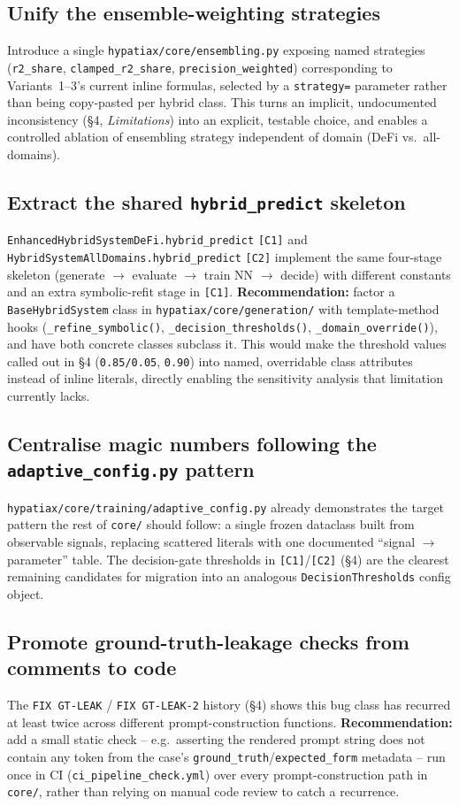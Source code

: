 \documentclass[11pt,a4paper]{article}
\newcommand{\code}[1]{\texttt{\small #1}}
\begin{document}
\subsection{Unify the ensemble-weighting strategies}
Introduce a single \code{hypatiax/core/ensembling.py} exposing named
strategies (\code{r2\_share}, \code{clamped\_r2\_share},
\code{precision\_weighted}) corresponding to Variants~1--3's current
inline formulas, selected by a \code{strategy=} parameter rather than
being copy-pasted per hybrid class. This turns an implicit, undocumented
inconsistency (\S4, \emph{Limitations}) into an explicit, testable choice,
and enables a controlled ablation of ensembling strategy independent of
domain (DeFi vs.\ all-domains).

\subsection{Extract the shared \code{hybrid\_predict} skeleton}
\code{EnhancedHybridSystemDeFi.hybrid\_predict} \code{[C1]} and
\code{HybridSystemAllDomains.hybrid\_predict} \code{[C2]} implement the same
four-stage skeleton (generate $\to$ evaluate $\to$ train NN $\to$ decide)
with different constants and an extra symbolic-refit stage in \code{[C1]}.
\textbf{Recommendation:} factor a \code{BaseHybridSystem} class in
\code{hypatiax/core/generation/} with template-method hooks
(\code{\_refine\_symbolic()}, \code{\_decision\_thresholds()},
\code{\_domain\_override()}), and have both concrete classes subclass it.
This would make the threshold values called out in \S4 (\code{0.85/0.05},
\code{0.90}) into named, overridable class attributes instead of inline
literals, directly enabling the sensitivity analysis that limitation
currently lacks.

\subsection{Centralise magic numbers following the \code{adaptive\_config.py} pattern}
\code{hypatiax/core/training/adaptive\_config.py} already demonstrates the
target pattern the rest of \code{core/} should follow: a single frozen
dataclass built from observable signals, replacing scattered literals with
one documented ``signal $\to$ parameter'' table. The decision-gate
thresholds in \code{[C1]}/\code{[C2]} (\S4) are the clearest remaining
candidates for migration into an analogous
\code{DecisionThresholds} config object.

\subsection{Promote ground-truth-leakage checks from comments to code}
The \code{FIX GT-LEAK} / \code{FIX GT-LEAK-2} history (\S4) shows this bug
class has recurred at least twice across different prompt-construction
functions. \textbf{Recommendation:} add a small static check --
e.g.\ asserting the rendered prompt string does not contain any token from
the case's \code{ground\_truth}/\code{expected\_form} metadata -- run once
in CI (\code{ci\_pipeline\_check.yml}) over every prompt-construction path
in \code{core/}, rather than relying on manual code review to catch a
recurrence.
\end{document}

